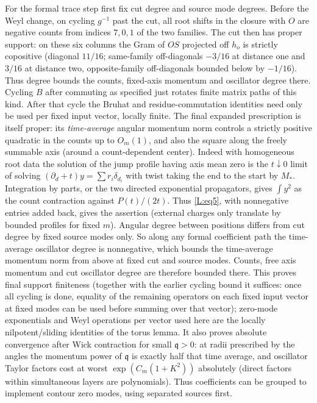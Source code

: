 For the formal trace step first fix cut degree and source mode degrees. Before the Weyl change, on cycling \(g^{-1}\) past the cut, all root shifts in the closure with \(O\) are negative counts from indices \(7,0,1\) of the two families. The cut then has proper support: on these six columns the Gram of \(OS\) projected off \(h_o\) is strictly copositive (diagonal \(11/16\); same-family off-diagonals \(-3/16\) at distance one and \(3/16\) at distance two, opposite-family off-diagonals bounded below by \(-1/16\)). Thus degree bounds the counts, fixed-axis momentum and oscillator degree there. Cycling \(B\) after commuting as specified just rotates finite matrix paths of this kind. After that cycle the Bruhat and residue-commutation identities need only be used per fixed input vector, locally finite. The final expanded prescription is itself proper: its \emph{time-average} angular momentum norm controls a strictly positive quadratic in the counts up to \(O_m(1)\), and also the square along the freely summable axis (around a count-dependent center). Indeed with homogeneous root data the solution of the jump profile having axis mean zero is the \(t\downarrow0\) limit of solving \((\partial_d+t)y=\sum r_i\delta_{d_i}\) with twist taking the end to the start by \(M_*\). Integration by parts, or the two directed exponential propagators, gives \(\int y^2\) as the count contraction against \(P(t)/(2t)\). Thus \eqref{L:eq5}, with nonnegative entries added back, gives the assertion (external charges only translate by bounded profiles for fixed \(m\)). Angular degree between positions differs from cut degree by fixed source modes only. So along any formal coefficient path the time-average oscillator degree is nonnegative, which bounds the time-average momentum norm from above at fixed cut and source modes. Counts, free axis momentum and cut oscillator degree are therefore bounded there. This proves final support finiteness (together with the earlier cycling bound it suffices: once all cycling is done, equality of the remaining operators on each fixed input vector at fixed modes can be used before summing over that vector); zero-mode exponentials and Weyl operations per vector used here are the locally nilpotent/sliding identities of the torus lemma. It also proves absolute convergence after Wick contraction for small \(\mathfrak q>0\): at radii prescribed by the angles the momentum power of \(\mathfrak q\) is exactly half that time average, and oscillator Taylor factors cost at worst \(\exp(C_m(1+K^2))\) absolutely (direct factors within simultaneous layers are polynomials). Thus coefficients can be grouped to implement contour zero modes, using separated sources first.

